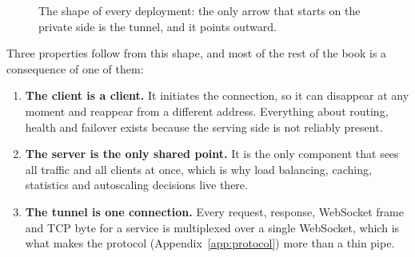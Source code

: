 \documentclass[11pt,a4paper,oneside]{book}
\begin{document}
\begin{figure}[htbp]
\centering
{}
\caption{The shape of every deployment: the only arrow that starts on the
private side is the tunnel, and it points outward.}
\end{figure}

Three properties follow from this shape, and most of the rest of the book
is a consequence of one of them:

\begin{enumerate}[leftmargin=1.5em]
  \item \textbf{The client is a client.} It initiates the connection, so
        it can disappear at any moment and reappear from a different
        address. Everything about routing, health and failover exists
        because the serving side is not reliably present.
  \item \textbf{The server is the only shared point.} It is the only
        component that sees all traffic and all clients at once, which is
        why load balancing, caching, statistics and autoscaling decisions
        live there.
  \item \textbf{The tunnel is one connection.} Every request, response,
        WebSocket frame and TCP byte for a service is multiplexed over a
        single WebSocket, which is what makes the protocol
        (Appendix~\ref{app:protocol}) more than a thin pipe.
\end{enumerate}
\end{document}
